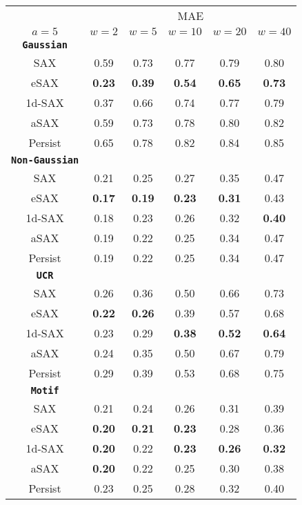 \begin{table}[H]
\centering
\begin{tabular}{cccccc} 
\toprule
& \multicolumn{5}{c}{\ac{MAE}} \\
\cmidrule(lr){2-6}
$a = 5$ & $w = 2$ & $w = 5$ & $w = 10$ & $w = 20$ & $w = 40$ \\
\midrule
\textbf{\texttt{Gaussian}} &  &  &  &  & \\
\ac{SAX} & 0.59 & 0.73 & 0.77 & 0.79 & 0.80 \\
\ac{eSAX} & \textbf{0.23} & \textbf{0.39} & \textbf{0.54} & \textbf{0.65} & \textbf{0.73} \\
\ac{1d-SAX} & 0.37 & 0.66 & 0.74 & 0.77 & 0.79 \\
\ac{aSAX} & 0.59 & 0.73 & 0.78 & 0.80 & 0.82 \\
Persist & 0.65 & 0.78 & 0.82 & 0.84 & 0.85 \\
\midrule
\textbf{\texttt{Non-Gaussian}} &  &  &  &  & \\
\ac{SAX} & 0.21 & 0.25 & 0.27 & 0.35 & 0.47 \\
\ac{eSAX} & \textbf{0.17} & \textbf{0.19} & \textbf{0.23} & \textbf{0.31} & 0.43 \\
\ac{1d-SAX} & 0.18 & 0.23 & 0.26 & 0.32 & \textbf{0.40} \\
\ac{aSAX} & 0.19 & 0.22 & 0.25 & 0.34 & 0.47 \\
Persist & 0.19 & 0.22 & 0.25 & 0.34 & 0.47 \\
\midrule
\textbf{\texttt{UCR}} &  &  &  &  & \\
\ac{SAX} & 0.26 & 0.36 & 0.50 & 0.66 & 0.73 \\
\ac{eSAX} & \textbf{0.22} & \textbf{0.26} & 0.39 & 0.57 & 0.68 \\
\ac{1d-SAX} & 0.23 & 0.29 & \textbf{0.38} & \textbf{0.52} & \textbf{0.64} \\
\ac{aSAX} & 0.24 & 0.35 & 0.50 & 0.67 & 0.79 \\
Persist & 0.29 & 0.39 & 0.53 & 0.68 & 0.75 \\
\midrule
\textbf{\texttt{Motif}} &  &  &  &  & \\
\ac{SAX} & 0.21 & 0.24 & 0.26 & 0.31 & 0.39 \\
\ac{eSAX} & \textbf{0.20} & \textbf{0.21} & \textbf{0.23} & 0.28 & 0.36 \\
\ac{1d-SAX} & \textbf{0.20} & 0.22 & \textbf{0.23} & \textbf{0.26} & \textbf{0.32} \\
\ac{aSAX} & \textbf{0.20} & 0.22 & 0.25 & 0.30 & 0.38 \\
Persist & 0.23 & 0.25 & 0.28 & 0.32 & 0.40 \\

\end{tabular}
\end{table}
